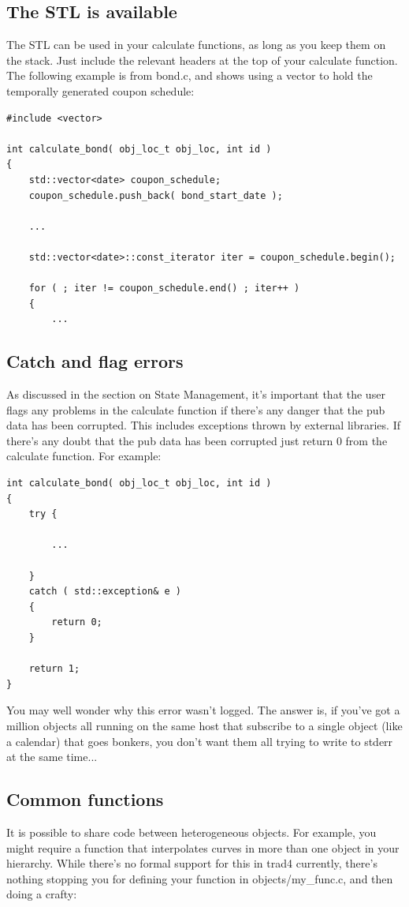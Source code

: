 \documentclass{report}
\begin{document}
\subsection{The STL is available}

The STL  can be used in your calculate functions, as long as you keep them on the stack. Just include the relevant headers at the top of your calculate function. The following example is from bond.c, and shows using a vector to hold the temporally generated coupon schedule:

\begin{verbatim}
#include <vector>

int calculate_bond( obj_loc_t obj_loc, int id )
{
    std::vector<date> coupon_schedule;
    coupon_schedule.push_back( bond_start_date );

    ...

    std::vector<date>::const_iterator iter = coupon_schedule.begin();

    for ( ; iter != coupon_schedule.end() ; iter++ )
    {
        ...
\end{verbatim}


\subsection{Catch and flag errors}

As discussed in the section on State Management, it's important that the user flags any problems in the calculate function if there's any danger that the pub data has been corrupted. This includes exceptions thrown by external libraries. If there's any doubt that the pub data has been corrupted just return 0 from the calculate function. For example:

\begin{verbatim}
int calculate_bond( obj_loc_t obj_loc, int id )
{
    try {

        ...

    }
    catch ( std::exception& e )
    {
        return 0;
    }

    return 1;
}
\end{verbatim}

You may well wonder why this error wasn't logged. The answer is, if you've got a million objects all running on the same host that subscribe to a single object (like a calendar) that goes bonkers, you don't want them all trying to write to stderr at the same time...



\subsection{Common functions}
It is possible to share code between heterogeneous objects. For example, you might require a function that interpolates curves in more than one object in your hierarchy. While there's no formal support for this in trad4 currently, there's nothing stopping you for defining your function in objects/my_func.c, and then doing a crafty:
\end{document}
